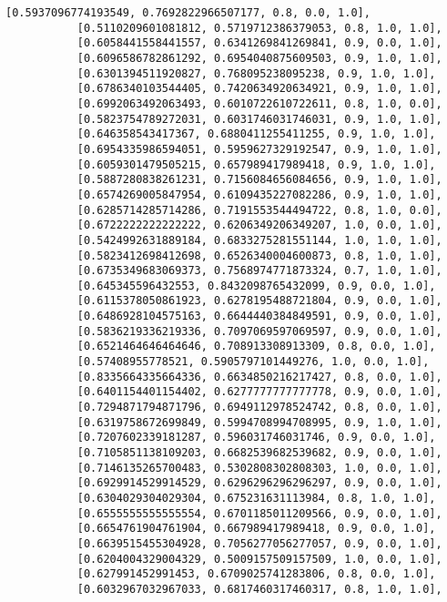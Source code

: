 \documentclass[11pt]{article}
\begin{document}
\begin{Verbatim}[commandchars=\\\{\}]
           [0.5937096774193549, 0.7692822966507177, 0.8, 0.0, 1.0],
           [0.5110209601081812, 0.5719712386379053, 0.8, 1.0, 1.0],
           [0.6058441558441557, 0.6341269841269841, 0.9, 0.0, 1.0],
           [0.6096586782861292, 0.6954040875609503, 0.9, 1.0, 1.0],
           [0.6301394511920827, 0.768095238095238, 0.9, 1.0, 1.0],
           [0.6786340103544405, 0.7420634920634921, 0.9, 1.0, 1.0],
           [0.6992063492063493, 0.6010722610722611, 0.8, 1.0, 0.0],
           [0.5823754789272031, 0.6031746031746031, 0.9, 1.0, 1.0],
           [0.646358543417367, 0.6880411255411255, 0.9, 1.0, 1.0],
           [0.6954335986594051, 0.5959627329192547, 0.9, 1.0, 1.0],
           [0.6059301479505215, 0.657989417989418, 0.9, 1.0, 1.0],
           [0.5887280838261231, 0.7156084656084656, 0.9, 1.0, 1.0],
           [0.6574269005847954, 0.6109435227082286, 0.9, 1.0, 1.0],
           [0.6285714285714286, 0.7191553544494722, 0.8, 1.0, 0.0],
           [0.6722222222222222, 0.6206349206349207, 1.0, 0.0, 1.0],
           [0.5424992631889184, 0.6833275281551144, 1.0, 1.0, 1.0],
           [0.5823412698412698, 0.6526340004600873, 0.8, 1.0, 1.0],
           [0.6735349683069373, 0.7568974771873324, 0.7, 1.0, 1.0],
           [0.645345596432553, 0.8432098765432099, 0.9, 0.0, 1.0],
           [0.6115378050861923, 0.6278195488721804, 0.9, 0.0, 1.0],
           [0.6486928104575163, 0.6644440384849591, 0.9, 0.0, 1.0],
           [0.5836219336219336, 0.7097069597069597, 0.9, 0.0, 1.0],
           [0.6521464646464646, 0.708913308913309, 0.8, 0.0, 1.0],
           [0.57408955778521, 0.5905797101449276, 1.0, 0.0, 1.0],
           [0.8335664335664336, 0.6634850216217427, 0.8, 0.0, 1.0],
           [0.6401154401154402, 0.6277777777777778, 0.9, 0.0, 1.0],
           [0.7294871794871796, 0.6949112978524742, 0.8, 0.0, 1.0],
           [0.6319758672699849, 0.5994708994708995, 0.9, 1.0, 1.0],
           [0.7207602339181287, 0.596031746031746, 0.9, 0.0, 1.0],
           [0.7105851138109203, 0.6682539682539682, 0.9, 0.0, 1.0],
           [0.7146135265700483, 0.5302808302808303, 1.0, 0.0, 1.0],
           [0.6929914529914529, 0.6296296296296297, 0.9, 0.0, 1.0],
           [0.6304029304029304, 0.675231631113984, 0.8, 1.0, 1.0],
           [0.6555555555555554, 0.6701185011209566, 0.9, 0.0, 1.0],
           [0.6654761904761904, 0.667989417989418, 0.9, 0.0, 1.0],
           [0.6639515455304928, 0.7056277056277057, 0.9, 0.0, 1.0],
           [0.6204004329004329, 0.5009157509157509, 1.0, 0.0, 1.0],
           [0.627991452991453, 0.6709025741283806, 0.8, 0.0, 1.0],
           [0.6032967032967033, 0.6817460317460317, 0.8, 1.0, 1.0],

\end{Verbatim}
\end{document}

